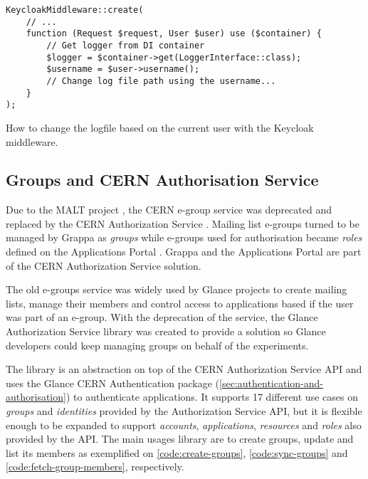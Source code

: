 \begin{listing}[htbp]
\begin{verbatim}
KeycloakMiddleware::create(
	// ...
	function (Request $request, User $user) use ($container) {
		// Get logger from DI container
		$logger = $container->get(LoggerInterface::class);
		$username = $user->username();
		// Change log file path using the username...
	}
);
\end{verbatim}
\caption{How to change the logfile based on the current user with the Keycloak middleware.}
\label{code:logger-username-config}
\end{listing}

\subsection{Groups and CERN Authorisation Service}

Due to the MALT project \cite{malt}, the CERN e-group service was deprecated and replaced by the CERN Authorization Service \cite{cern-authorization-service}. Mailing list e-groups turned to be managed by Grappa \cite{grappa-website} as \textit{groups} while e-groups used for authorisation became \textit{roles} defined on the Applications Portal \cite{applications-portal}. Grappa and the Applications Portal are part of the CERN Authorization Service solution.

The old e-groups service was widely used by Glance projects to create mailing lists, manage their members and control access to applications based if the user was part of an e-group. With the deprecation of the service, the Glance Authorization Service library \cite{glance-authz-service} was created to provide a solution so Glance developers could keep managing groups on behalf of the experiments.

The library is an abstraction on top of the CERN Authorization Service API \cite{authz-service-api} and uses the Glance CERN Authentication package (\autoref{sec:authentication-and-authorisation}) to authenticate applications. It supports 17 different use cases on \textit{groups} and \textit{identities} provided by the Authorization Service API, but it is flexible enough to be expanded to support \textit{accounts}, \textit{applications}, \textit{resources} and \textit{roles} also provided by the API.  The main usages library are to create groups, update and list its members as exemplified on \autoref{code:create-groups}, \autoref{code:sync-groups} and \autoref{code:fetch-group-members}, respectively.

